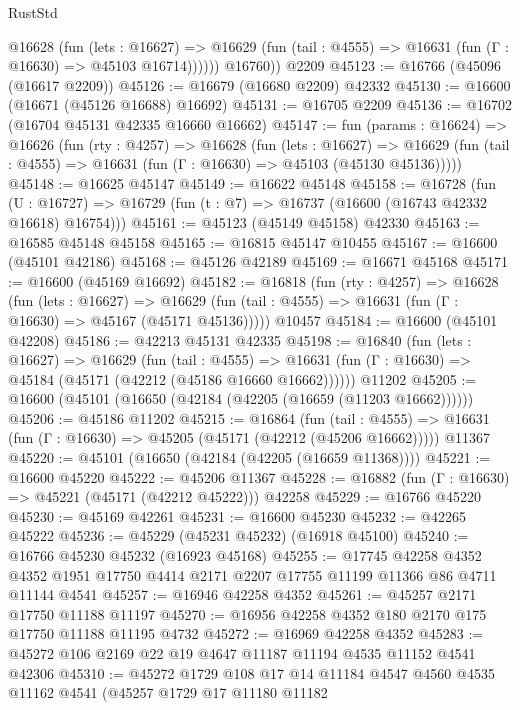 \begin{lexlean}{RustStd}
\begin{coremodule}
            @16628
              (fun (lets : @16627) =>
              @16629 (fun (tail : @4555) => @16631 (fun (Γ : @16630) => @45103 @16714))))))
        @16760))
    @2209
@45123 := @16766 (@45096 (@16617 @2209))
@45126 := @16679 (@16680 @2209) @42332
@45130 := @16600 (@16671 (@45126 @16688) @16692)
@45131 := @16705 @2209
@45136 := @16702 (@16704 @45131 @42335 @16660 @16662)
@45147 := fun (params : @16624) =>
  @16626
    (fun (rty : @4257) =>
    @16628
      (fun (lets : @16627) =>
      @16629 (fun (tail : @4555) => @16631 (fun (Γ : @16630) => @45103 (@45130 @45136)))))
@45148 := @16625 @45147
@45149 := @16622 @45148
@45158 := @16728
    (fun (U : @16727) => @16729 (fun (t : @7) => @16737 (@16600 (@16743 @42332 @16618) @16754)))
@45161 := @45123 (@45149 @45158) @42330
@45163 := @16585 @45148 @45158
@45165 := @16815 @45147 @10455
@45167 := @16600 (@45101 @42186)
@45168 := @45126 @42189
@45169 := @16671 @45168
@45171 := @16600 (@45169 @16692)
@45182 := @16818
    (fun (rty : @4257) =>
    @16628
      (fun (lets : @16627) =>
      @16629 (fun (tail : @4555) => @16631 (fun (Γ : @16630) => @45167 (@45171 @45136)))))
    @10457
@45184 := @16600 (@45101 @42208)
@45186 := @42213 @45131 @42335
@45198 := @16840
    (fun (lets : @16627) =>
    @16629
      (fun (tail : @4555) =>
      @16631 (fun (Γ : @16630) => @45184 (@45171 (@42212 (@45186 @16660 @16662))))))
    @11202
@45205 := @16600 (@45101 (@16650 (@42184 (@42205 (@16659 (@11203 @16662))))))
@45206 := @45186 @11202
@45215 := @16864
    (fun (tail : @4555) => @16631 (fun (Γ : @16630) => @45205 (@45171 (@42212 (@45206 @16662)))))
    @11367
@45220 := @45101 (@16650 (@42184 (@42205 (@16659 @11368))))
@45221 := @16600 @45220
@45222 := @45206 @11367
@45228 := @16882 (fun (Γ : @16630) => @45221 (@45171 (@42212 @45222))) @42258
@45229 := @16766 @45220
@45230 := @45169 @42261
@45231 := @16600 @45230
@45232 := @42265 @45222
@45236 := @45229 (@45231 @45232) (@16918 @45100)
@45240 := @16766 @45230 @45232 (@16923 @45168)
@45255 := @17745
    @42258
    @4352
    @4352
    @1951
    @17750
    @4414
    @2171
    @2207
    @17755
    @11199
    @11366
    @86
    @4711
    @11144
    @4541
@45257 := @16946 @42258 @4352
@45261 := @45257 @2171 @17750 @11188 @11197
@45270 := @16956 @42258 @4352 @180 @2170 @175 @17750 @11188 @11195 @4732
@45272 := @16969 @42258 @4352
@45283 := @45272 @106 @2169 @22 @19 @4647 @11187 @11194 @4535 @11152 @4541 @42306
@45310 := @45272
    @1729
    @108
    @17
    @14
    @11184
    @4547
    @4560
    @4535
    @11162
    @4541
    (@45257
      @1729
      @17
      @11180
      @11182

\end{coremodule}
\end{lexlean}
